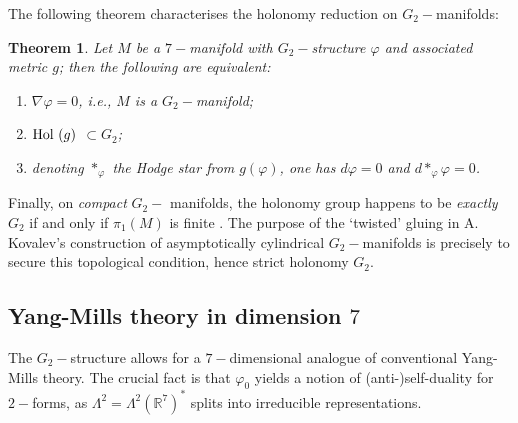 \documentclass{article}
\newcommand{\func}[1]{\textnormal {#1\,}}
\newtheorem{theorem}{Theorem}
\begin{document}
The following theorem \cite[10.1.3]{Joyce}\cite{Fernandez&Gray} characterises the holonomy reduction on  $G_{2}-$manifolds:
\begin{theorem}         \label{G2 holonomy theorem}
Let $M$ be a $7-$manifold with $G_{2}-$structure $\varphi$ and associated metric $g$; then the following are equivalent:
\begin{enumerate}
        \item $\nabla \varphi =0$, i.e., $M$ is a $G_{2}-$manifold;
        \item $\func{Hol}\left( g\right) $ $\subset G_{2}$;
        \item denoting $\ast _{\varphi }$  the Hodge star from $g(\varphi)$, one has $d\varphi =0$ and $d\ast _{\varphi }\varphi =0$.
\end{enumerate}
\end{theorem}

Finally, on \emph{compact }$G_{2}-$%
manifolds, the holonomy group happens to be \emph{exactly} $G_{2}$ if and only if $\pi _{1}\left(M\right)$ is finite \cite[10.2.2]{Joyce}. The purpose of the `twisted' gluing in A. Kovalev's construction of asymptotically cylindrical $G_2-$manifolds is precisely to secure this topological condition, hence strict holonomy $G_2$.

\subsection{Yang-Mills theory in dimension $7$}

The $G_{2}-$structure allows for a $7-$dimensional analogue of conventional
Yang-Mills theory. The crucial fact is that $%
\varphi _{0}$ yields a notion of (anti-)self-duality for $2-$forms, as $\Lambda ^{2}=\Lambda ^{2}\left( \mathbb{R}%
^{7}\right) ^{\ast }$ splits into irreducible representations.
\end{document}
